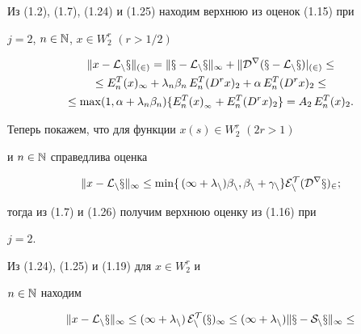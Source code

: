 \begin{pf}
\begin{equation}
\end{equation}





Из (1.2), (1.7), (1.24) и (1.25) находим верхнюю из оценок (1.15) при


$j=2$, $n\in \Bbb{N}$, $x\in W_2^r$ $(r>1/2)$


\begin{gather*}


\|x-\cal {L}_nx\|_{(2)}=


\|x-\cal{L}_nx\|_\infty +


\|D^r(x-\cal{L}_nx)|_{(2)}\le\\


%


\le E_n^T(x)_\infty +\lambda_n\beta_n\, E_n^T(D^rx)_2 +


\alpha\, E_n^T(D^rx)_2\le\\


%


\le \max (1,\alpha +\lambda_n \beta_n)\{ E_n^T(x)_{{}_\infty } +


E_n^T(D^rx)_2\} = A_2\, E_n^T(x)_2.


\end{gather*}





Теперь покажем, что для функции $x(s)\in W_2^r$ $(2r>1)$


и $n\in \Bbb{N}$ справедлива оценка


\begin{equation}


\|x-\cal{L}_nx\|_\infty \le \min \{\, (1+\lambda_n)\beta_n,


\beta_n +\gamma_n\} E_n^T(D^rx)_2;


\end{equation}


тогда из (1.7) и (1.26) получим верхнюю оценку из (1.16) при


$j=2$.





Из (1.24), (1.25) и (1.19) для $x\in W_2^r$ и


$n\in \Bbb{N}$ находим


\begin{gather}


\|x-\cal{L}_nx\|_\infty \le (1+\lambda_n)\,


E_n^T(x)_\infty \le (1+\lambda_n)\|x-S_nx\|_\infty \le\notag\\



\end{gather}
\end{pf}
